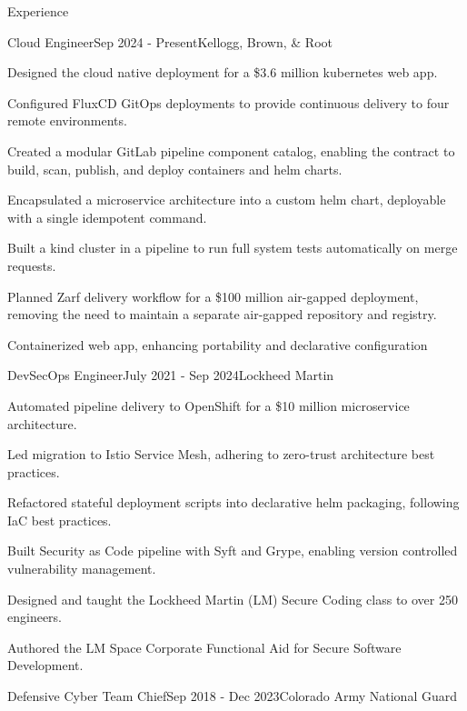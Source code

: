 \documentclass[
	a4paper, %
	11pt, %
]{resume} %
\begin{document}
\begin{rSection}{Experience}

	\begin{rSubsection}{Cloud Engineer}{Sep 2024 - Present}{Kellogg, Brown, \& Root}
		\item Designed the cloud native deployment for a \$3.6 million kubernetes web app.
		\item Configured FluxCD GitOps deployments to provide continuous delivery to four remote environments.
		\item Created a modular GitLab pipeline component catalog, enabling the contract to build, scan, publish, and deploy containers and helm charts.
		\item Encapsulated a microservice architecture into a custom helm chart, deployable with a single idempotent command.
		\item Built a kind cluster in a pipeline to run full system tests automatically on merge requests.
		\item Planned Zarf delivery workflow for a \$100 million air-gapped deployment, removing the need to maintain a separate air-gapped repository and registry.
		\item Containerized web app, enhancing portability and declarative configuration
	\end{rSubsection}
	\begin{rSubsection}{DevSecOps Engineer}{July 2021 - Sep 2024}{Lockheed Martin}
		\item Automated pipeline delivery to OpenShift for a \$10 million microservice architecture.
		\item Led migration to Istio Service Mesh, adhering to zero-trust architecture best practices.
		\item Refactored stateful deployment scripts into declarative helm packaging, following IaC best practices.
		\item Built Security as Code pipeline with Syft and Grype, enabling version controlled vulnerability management.
		\item Designed and taught the Lockheed Martin (LM) Secure Coding class to over 250 engineers.
		\item Authored the LM Space Corporate Functional Aid for Secure Software Development.
	\end{rSubsection}
	\begin{rSubsection}{Defensive Cyber Team Chief}{Sep 2018 - Dec 2023}{Colorado Army National Guard}

\end{rSubsection}
\end{rSection}
\end{document}
